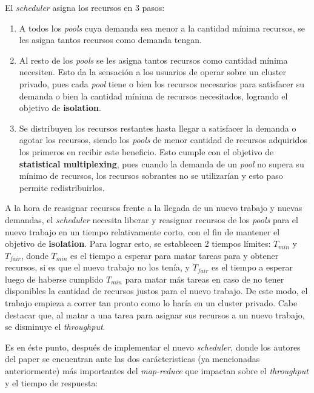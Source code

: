 \documentclass[a4paper]{article}
\begin{document}
El \textit{scheduler} asigna los recursos en 3 pasos:
\begin{enumerate}
	\item A todos los \textit{pools} cuya demanda sea menor a la cantidad mínima
  recursos, se les asigna tantos recursos como demanda tengan.
	\item Al resto de los \textit{pools} se les asigna tantos recursos como
  cantidad mínima necesiten. Esto da la sensación a los usuarios de operar
  sobre un cluster privado, pues cada \textit{pool} tiene o bien los recursos
  necesarios para satisfacer su demanda o bien la cantidad mínima de recursos
  necesitados, logrando el objetivo de \textbf{isolation}.
	\item Se distribuyen los recursos restantes hasta llegar a satisfacer la
  demanda o agotar los recursos, siendo los \textit{pools} de menor cantidad de
  recursos adquiridos los primeros en recibir este beneficio. Esto cumple con
  el objetivo de \textbf{statistical multiplexing}, pues cuando la demanda de
  un \textit{pool} no supera su mínimo de recursos, los recursos sobrantes no
  se utilizarían y esto paso permite redistribuirlos.
\end{enumerate}

A la hora de reasignar recursos frente a la llegada de un nuevo trabajo y
nuevas demandas, el \textit{scheduler} necesita liberar y reasignar recursos de
los \textit{pools} para el nuevo trabajo en un tiempo relativamente corto, con
el fin de mantener el objetivo de \textbf{isolation}. Para lograr esto, se
establecen 2 tiempos límites: $T_{min}$ y $T_{fair}$, donde $T_{min}$ es el
tiempo a esperar para matar tareas para y obtener recursos, si es que el nuevo
trabajo no los tenía, y $T_{fair}$ es el tiempo a esperar luego de haberse
cumplido $T_{min}$ para matar más tareas en caso de no tener disponibles la
cantidad de recursos justos para el nuevo trabajo. De este modo, el trabajo
empieza a correr tan pronto como lo haría en un cluster privado. Cabe destacar
que, al matar a una tarea para asignar sus recursos a un nuevo trabajo, se
disminuye el \textit{throughput}.

Es en éste punto, después de implementar el nuevo \textit{scheduler}, donde los
autores del paper se encuentran ante las dos carácteristicas (ya mencionadas
anteriormente) más importantes del \textit{map-reduce} que impactan sobre el
\textit{throughput} y el tiempo de respuesta:
\end{document}
